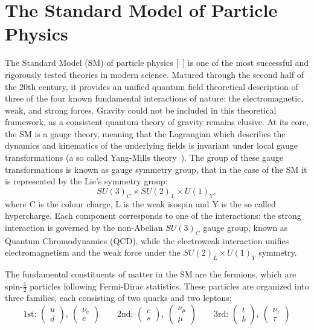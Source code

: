\documentclass[11pt,twoside]{book}
\begin{document}
\section{The Standard Model of Particle Physics}
\label{sec:SM_intro}
The Standard Model (\acrshort{SM}) of particle physics [~\cite{Griffiths, ellis2013higgsphysics, pich2012, Djouadi_2008}] is one of the most successful and rigorously tested theories in modern science. Matured through the second half of the 20th century, it provides an unified quantum field theoretical description of three of the four known fundamental interactions of nature: the electromagnetic, weak, and strong forces. Gravity could not be included in this theoretical framework, as a consistent quantum theory of gravity remains elusive. 
At its core, the \acrshort{SM} is a gauge theory, meaning that the Lagrangian which describes the dynamics and kinematics of the underlying fields is invariant under local gauge transformations (a so called Yang-Mills theory~\cite{YMills}). The group of these gauge transformations is known as gauge symmetry group, that in the case of the \acrshort{SM} it is represented by the Lie's symmetry group:
\begin{equation}
    SU(3)_C \times SU(2)_L \times U(1)_Y,
\end{equation}
where C is the colour charge, L is the weak isospin and Y is the so called hypercharge. Each component corresponds to one of the interactions: the strong interaction is governed by the non-Abelian $SU(3)_C$ gauge group, known as Quantum Chromodynamics (\acrshort{QCD}), while the electroweak interaction unifies electromagnetism and the weak force under the $SU(2)_L \times U(1)_Y$ symmetry.

The fundamental constituents of matter in the \acrshort{SM} are the fermions, which are spin-$\frac{1}{2}$ particles following Fermi-Dirac statistics. These particles are organized into three families, each consisting of two quarks and two leptons: 
\begin{equation}
\text{1st: } \left( \begin{matrix} u \\ d \end{matrix} \right),\ \left( \begin{matrix} \nu_e \\ e \end{matrix} \right) \qquad
\text{2nd: } \left( \begin{matrix} c \\ s \end{matrix} \right),\ \left( \begin{matrix} \nu_\mu \\ \mu \end{matrix} \right) \qquad
\text{3rd: } \left( \begin{matrix} t \\ b \end{matrix} \right),\ \left( \begin{matrix} \nu_\tau \\ \tau \end{matrix} \right)
\end{equation}
\end{document}
